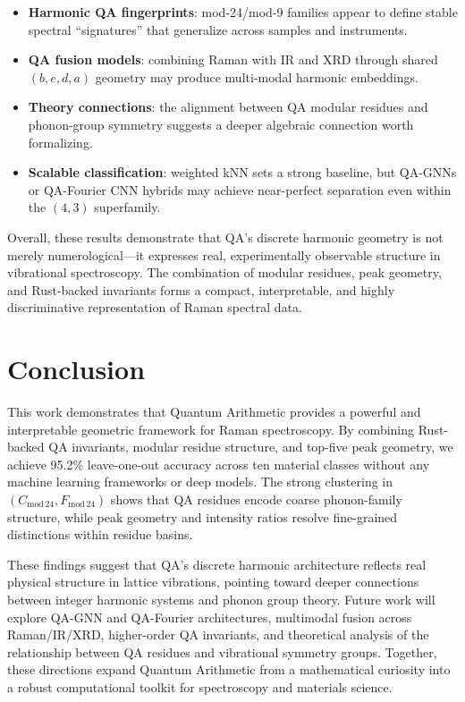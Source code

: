 \documentclass[12pt]{article}
\begin{document}
\begin{itemize}
    \item \textbf{Harmonic QA fingerprints}: mod-24/mod-9 families appear to define stable spectral 
          ``signatures'' that generalize across samples and instruments.
    \item \textbf{QA fusion models}: combining Raman with IR and XRD through shared $(b,e,d,a)$ geometry 
          may produce multi-modal harmonic embeddings.
    \item \textbf{Theory connections}: the alignment between QA modular residues and phonon-group symmetry 
          suggests a deeper algebraic connection worth formalizing.
    \item \textbf{Scalable classification}: weighted kNN sets a strong baseline, but QA-GNNs or 
          QA-Fourier CNN hybrids may achieve near-perfect separation even within the $(4,3)$ superfamily.
\end{itemize}

Overall, these results demonstrate that QA’s discrete harmonic geometry is not merely numerological—it 
expresses real, experimentally observable structure in vibrational spectroscopy. The combination of 
modular residues, peak geometry, and Rust-backed invariants forms a compact, interpretable, and 
highly discriminative representation of Raman spectral data.

\section{Conclusion}
\label{sec:conclusion}

This work demonstrates that Quantum Arithmetic provides a powerful and interpretable geometric framework for
Raman spectroscopy. By combining Rust-backed QA invariants, modular residue structure, and top-five peak
geometry, we achieve 95.2\% leave-one-out accuracy across ten material classes without any machine learning
frameworks or deep models. The strong clustering in $(C_{\mathrm{mod}\,24},F_{\mathrm{mod}\,24})$ shows that
QA residues encode coarse phonon-family structure, while peak geometry and intensity ratios resolve
fine-grained distinctions within residue basins.

These findings suggest that QA’s discrete harmonic architecture reflects real physical structure in lattice
vibrations, pointing toward deeper connections between integer harmonic systems and phonon group theory.
Future work will explore QA-GNN and QA-Fourier architectures, multimodal fusion across Raman/IR/XRD,
higher-order QA invariants, and theoretical analysis of the relationship between QA residues and vibrational
symmetry groups. Together, these directions expand Quantum Arithmetic from a mathematical curiosity into a
robust computational toolkit for spectroscopy and materials science.
\end{document}
